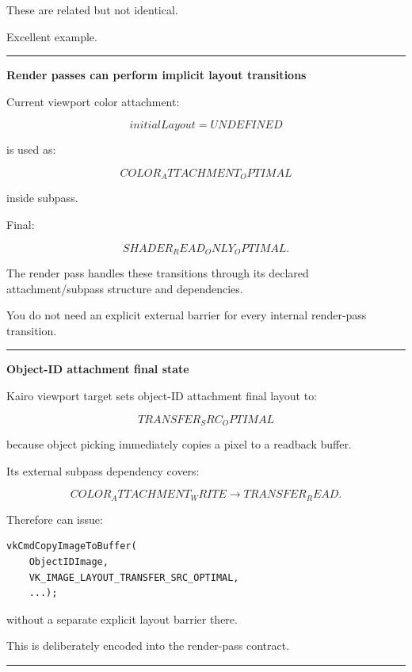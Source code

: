 These are related but not identical.

Excellent example.

\begin{center}\rule{0.5\linewidth}{0.5pt}\end{center}

\textbf{Render passes can perform implicit layout transitions}

Current viewport color attachment:

\[
initialLayout=UNDEFINED
\]

is used as:

\[
COLOR_ATTACHMENT_OPTIMAL
\]

inside subpass.

Final:

\[
SHADER_READ_ONLY_OPTIMAL.
\]

The render pass handles these transitions through its declared attachment/subpass structure and dependencies.

You do not need an explicit external barrier for every internal render-pass transition.

\begin{center}\rule{0.5\linewidth}{0.5pt}\end{center}

\textbf{Object-ID attachment final state}

Kairo viewport target sets object-ID attachment final layout to:

\[
\boxed{
TRANSFER_SRC_OPTIMAL
}
\]

because object picking immediately copies a pixel to a readback buffer.

Its external subpass dependency covers:

\[
COLOR_ATTACHMENT_WRITE
\rightarrow
TRANSFER_READ.
\]

Therefore  can issue:

\begin{verbatim}
vkCmdCopyImageToBuffer(
    ObjectIDImage,
    VK_IMAGE_LAYOUT_TRANSFER_SRC_OPTIMAL,
    ...);
\end{verbatim}

without a separate explicit layout barrier there.

This is deliberately encoded into the render-pass contract.

\begin{center}\rule{0.5\linewidth}{0.5pt}\end{center}

